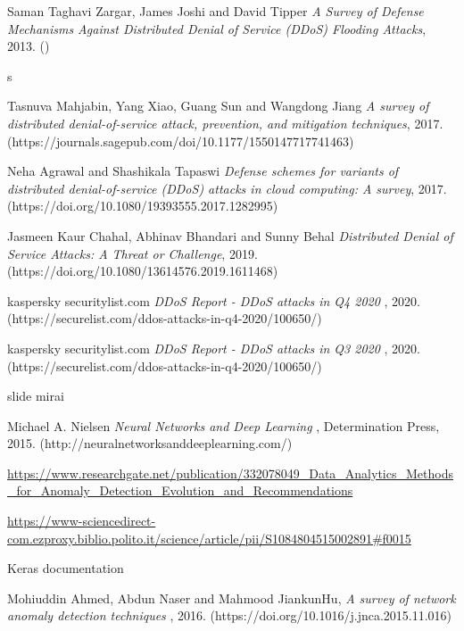 \begin{thebibliography}{9}
     Saman Taghavi Zargar, James Joshi and David Tipper {\em A Survey of Defense Mechanisms Against Distributed Denial of Service (DDoS) Flooding Attacks}, 2013. ()

     s

     Tasnuva Mahjabin, Yang Xiao, Guang Sun and Wangdong Jiang {\em A survey of distributed denial-of-service attack, prevention, and mitigation techniques}, 2017. (https://journals.sagepub.com/doi/10.1177/1550147717741463)

     Neha Agrawal and Shashikala Tapaswi {\em Defense schemes for variants of distributed denial-of-service (DDoS) attacks in cloud
    computing: A survey}, 2017. (https://doi.org/10.1080/19393555.2017.1282995)

     Jasmeen Kaur Chahal, Abhinav Bhandari and Sunny Behal {\em Distributed Denial of Service Attacks: A Threat or Challenge}, 2019. (https://doi.org/10.1080/13614576.2019.1611468)

     kaspersky securitylist.com {\em DDoS Report - DDoS attacks in Q4 2020
    }, 2020. (https://securelist.com/ddos-attacks-in-q4-2020/100650/)
  
     kaspersky securitylist.com {\em DDoS Report - DDoS attacks in Q3 2020
    }, 2020. (https://securelist.com/ddos-attacks-in-q4-2020/100650/)    

     slide mirai

     Michael A. Nielsen  {\em Neural Networks and Deep Learning }, Determination Press, 2015. (http://neuralnetworksanddeeplearning.com/)   

     \url{https://www.researchgate.net/publication/332078049_Data_Analytics_Methods_for_Anomaly_Detection_Evolution_and_Recommendations}

     \url{https://www-sciencedirect-com.ezproxy.biblio.polito.it/science/article/pii/S1084804515002891#f0015}

      Keras documentation 
    
      Mohiuddin Ahmed, Abdun Naser and Mahmood JiankunHu, {\em A survey of network anomaly detection techniques }, 2016. (https://doi.org/10.1016/j.jnca.2015.11.016)


\end{thebibliography}
